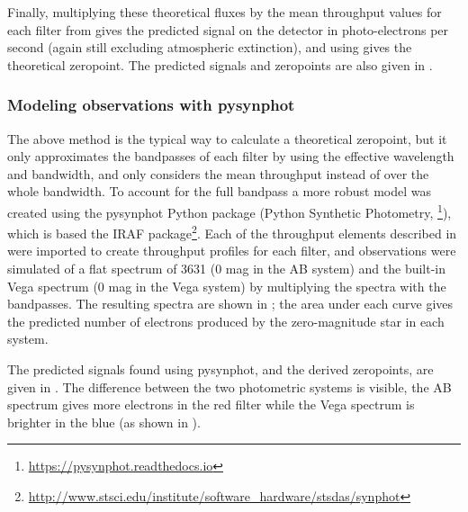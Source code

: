 \begin{colsection}
Finally, multiplying these theoretical fluxes by the mean throughput values for each filter from  gives the predicted signal on the detector in photo-electrons per second (again still excluding atmospheric extinction), and using  gives the theoretical zeropoint. The predicted signals and zeropoints are also given in .

\newpage

\subsubsection{Modeling observations with pysynphot}

The above method is the typical way to calculate a theoretical zeropoint, but it only approximates the bandpasses of each filter by using the effective wavelength and bandwidth, and only considers the mean throughput instead of over the whole bandwidth. To account for the full bandpass a more robust model was created using the pysynphot Python package (Python Synthetic Photometry, \footnote{\url{https://pysynphot.readthedocs.io}}), which is based the IRAF  package\footnote{\url{http://www.stsci.edu/institute/software_hardware/stsdas/synphot}}. Each of the throughput elements described in  were imported to create throughput profiles for each filter, and observations were simulated of a flat spectrum of \SI{3631}{\jansky} (0 mag in the AB system) and the built-in Vega spectrum (0 mag in the Vega system) by multiplying the spectra with the bandpasses. The resulting spectra are shown in ; the area under each curve gives the predicted number of electrons produced by the zero-magnitude star in each system.

The predicted signals found using pysynphot, and the derived zeropoints, are given in . The difference between the two photometric systems is visible, the AB spectrum gives more electrons in the red filter while the Vega spectrum is brighter in the blue (as shown in ).


\end{colsection}
